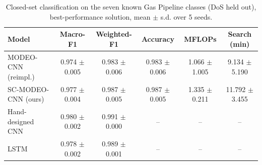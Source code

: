 \begin{table}[t]
\centering
\caption{Closed-set classification on the seven known Gas Pipeline classes (DoS held out), best-performance solution, mean $\pm$ s.d. over 5 seeds.}
\label{tab:classification}
\footnotesize
\begin{tabular}{lccccc}
\toprule
Model & Macro-F1 & Weighted-F1 & Accuracy & MFLOPs & Search (min) \\
\midrule
MODEO-CNN (reimpl.) & 0.974 $\pm$ 0.005 & 0.983 $\pm$ 0.006 & 0.983 $\pm$ 0.006 & 1.066 $\pm$ 1.005 & 9.134 $\pm$ 5.190 \\
SC-MODEO-CNN (ours) & 0.977 $\pm$ 0.004 & 0.987 $\pm$ 0.005 & 0.987 $\pm$ 0.005 & 1.335 $\pm$ 0.211 & 11.792 $\pm$ 3.455 \\
Hand-designed CNN & 0.980 $\pm$ 0.002 & 0.991 $\pm$ 0.000 & -- & -- & -- \\
LSTM & 0.978 $\pm$ 0.002 & 0.989 $\pm$ 0.001 & -- & -- & -- \\
\bottomrule
\end{tabular}
\end{table}
